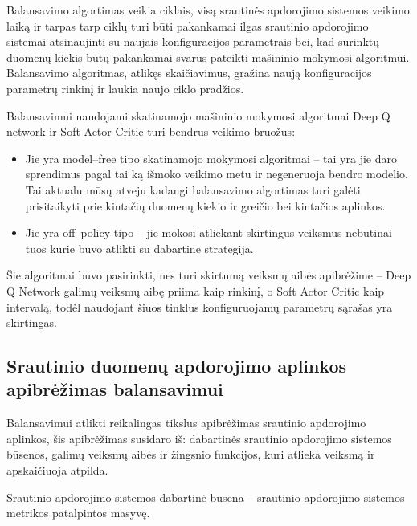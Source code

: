 \documentclass{VUMIFPSbakalaurinis}
\begin{document}
Balansavimo algortimas veikia ciklais, visą srautinės apdorojimo sistemos veikimo laiką ir tarpas tarp ciklų turi būti pakankamai ilgas srautinio apdorojimo sistemai atsinaujinti su naujais konfiguracijos parametrais bei, kad surinktų duomenų kiekis būtų pakankamai svarūs pateikti mašininio mokymosi algoritmui. Balansavimo algoritmas, atlikęs skaičiavimus, gražina naują konfiguracijos parametrų rinkinį ir laukia naujo ciklo pradžios. 



Balansavimui naudojami skatinamojo mašininio mokymosi algoritmai Deep Q network \cite{fan2020theoretical} ir Soft Actor Critic \cite{haarnoja2019soft} turi bendrus veikimo bruožus:
\begin{itemize}
    \item Jie yra model–free tipo skatinamojo mokymosi algoritmai – tai yra jie daro sprendimus pagal tai ką išmoko veikimo metu ir negeneruoja bendro modelio. Tai aktualu mūsų atveju kadangi balansavimo algortimas turi galėti prisitaikyti prie kintačių duomenų kiekio ir greičio bei kintačios aplinkos.
    \item Jie yra off–policy tipo – jie mokosi atliekant skirtingus veiksmus nebūtinai tuos kurie buvo atlikti su dabartine strategija.
\end{itemize} 

Šie algoritmai buvo pasirinkti, nes turi skirtumą veiksmų aibės apibrėžime – Deep Q Network galimų veiksmų aibę priima kaip rinkinį, o Soft Actor Critic kaip intervalą, todėl naudojant šiuos tinklus konfiguruojamų parametrų sąrašas yra skirtingas. 

\subsection{Srautinio duomenų apdorojimo aplinkos apibrėžimas balansavimui}

Balansavimui atlikti reikalingas tikslus apibrėžimas srautinio apdorojimo aplinkos, šis apibrėžimas susidaro iš: dabartinės srautinio apdorojimo sistemos būsenos, galimų veiksmų aibės ir žingsnio funkcijos, kuri atlieka veiksmą ir apskaičiuoja atpilda.

Srautinio apdorojimo sistemos dabartinė būsena – srautinio apdorojimo sistemos metrikos patalpintos masyvę.
\end{document}
